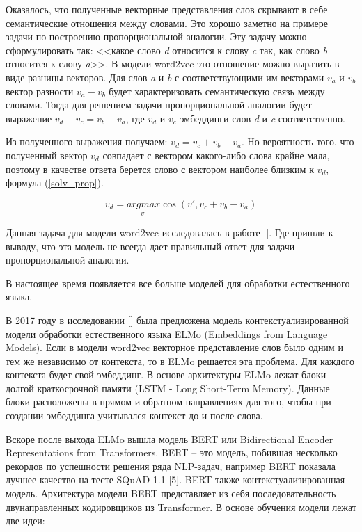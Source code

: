 \documentclass[a4paper,14pt]{article}
\begin{document}
Оказалось, что полученные векторные представления слов скрывают в себе семантические отношения между словами.
Это хорошо заметно на примере задачи по построению пропорциональной аналогии.
Эту задачу можно сформулировать так: <<какое слово \textit{d} относится к слову \textit{c} так, 
как слово \textit{b} относится к слову \textit{a}>>.
В модели word2vec это отношение можно выразить в виде разницы векторов.
Для слов \textit{a} и \textit{b} с соответствующими им векторами $v_a$ и $v_b$ вектор разности $v_a - v_b$ будет характеризовать семантическую связь между словами.
Тогда для решением задачи пропорциональной аналогии будет выражение $v_d - v_c = v_b - v_a$, где $v_d$ и $v_c$ эмбеддинги слов \textit{d} и \textit{c} соответственно.

Из полученного выражения получаем: $v_d = v_c + v_b - v_a$.
Но вероятность того, что полученный вектор $v_d$ совпадает с вектором какого-либо слова крайне мала, поэтому в качестве ответа берется слово с вектором наиболее близким к $v_d$, формула (\ref{solv_prop}).

\begin{equation}
	v_d = \underset{v'}{argmax} \cos (v', v_c + v_b - v_a)
	\label{solv_prop}
\end{equation}

Данная задача для модели word2vec исследовалась в работе []. Где пришли к выводу, что эта модель не всегда дает правильный ответ для задачи пропорциональной аналогии.

В настоящее время появляется все больше моделей для обработки естественного языка.

В 2017 году в исследовании [] была предложена модель контекстуализированной модели обработки естественного языка ELMo (Embeddings from Language Models).
Если в модели word2vec векторное представление слов было одним и тем же независимо от контекста, то в ELMo решается эта проблема.
Для каждого контекста будет свой эмбеддинг.
В основе архитектуры ELMo лежат блоки долгой краткосрочной памяти (LSTM - Long Short-Term Memory).
Данные блоки расположены в прямом и обратном направлениях для того, чтобы при создании эмбеддинга учитывался контекст до и после слова.

Вскоре после выхода ELMo вышла модель BERT или Bidirectional Encoder Representations from Transformers.
BERT – это модель, побившая несколько рекордов по успешности решения ряда NLP-задач, например BERT показала лучшее качество на тесте SQuAD 1.1 [5].
BERT также контекстуализированная модель.
Архитектура модели BERT представляет из себя последовательность двунаправленных кодировщиков из Transformer.
В основе обучения модели лежат две идеи:
\end{document}
